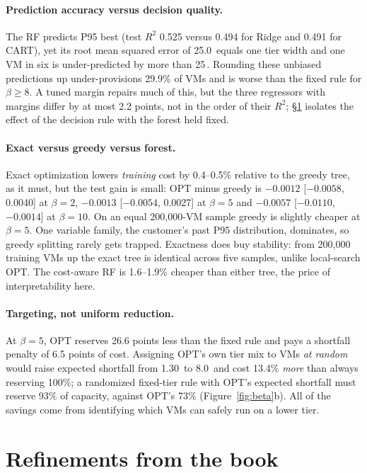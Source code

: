 \documentclass[10pt]{article}
\newcommand{\pp}{\,\text{pp}}
\begin{document}
\paragraph{Prediction accuracy versus decision quality.} The RF predicts P95 best (test $R^2$ 0.525 versus 0.494 for Ridge and 0.491 for CART), yet its root mean squared error of 25.0\pp{} equals one tier width and one VM in six is under-predicted by more than 25\pp. Rounding these unbiased predictions up under-provisions 29.9\% of VMs and is worse than the fixed rule for $\beta\ge8$. A tuned margin repairs much of this, but the three regressors with margins differ by at most 2.2 points, not in the order of their $R^2$; \S\ref{sec:refine} isolates the effect of the decision rule with the forest held fixed.

\paragraph{Exact versus greedy versus forest.} Exact optimization lowers \emph{training} cost by 0.4--0.5\% relative to the greedy tree, as it must, but the test gain is small: OPT minus greedy is $-0.0012$ [$-0.0058$, 0.0040] at $\beta=2$, $-0.0013$ [$-0.0054$, 0.0027] at $\beta=5$ and $-0.0057$ [$-0.0110$, $-0.0014$] at $\beta=10$. On an equal 200,000-VM sample greedy is slightly cheaper at $\beta=5$. One variable family, the customer's past P95 distribution, dominates, so greedy splitting rarely gets trapped. Exactness does buy stability: from 200,000 training VMs up the exact tree is identical across five samples, unlike local-search OPT. The cost-aware RF is 1.6--1.9\% cheaper than either tree, the price of interpretability here.

\paragraph{Targeting, not uniform reduction.} At $\beta=5$, OPT reserves 26.6 points less than the fixed rule and pays a shortfall penalty of 6.5 points of cost. Assigning OPT's own tier mix to VMs \emph{at random} would raise expected shortfall from 1.30\pp{} to 8.0\pp{} and cost 13.4\% \emph{more} than always reserving 100\%; a randomized fixed-tier rule with OPT's expected shortfall must reserve 93\% of capacity, against OPT's 73\% (Figure~\ref{fig:beta}b). All of the savings come from identifying which VMs can safely run on a lower tier.

\section{Refinements from the book}
\label{sec:refine}
\end{document}
